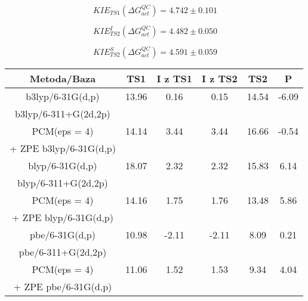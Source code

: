 \documentclass[10pt,a4paper]{article}
\begin{document}
    \begin{equation}
    KIE_{TS1} \left( \Delta  G^{QC}_{act} \right) = 4.742 \pm 0.101
  \end{equation}
  
   \begin{equation}
    KIE^I_{TS2} \left( \Delta  G^{QC}_{act} \right) = 4.482 \pm 0.050
  \end{equation}
  
  
  
  \begin{equation}
    KIE^S_{TS2} \left( \Delta  G^{QC}_{act} \right) = 4.591 \pm 0.059
  \end{equation}
  


   \begin{tabular}{||c c c c c c||} 
 \hline
 Metoda/Baza & TS1 & I z TS1 & I z TS2 & TS2 & P \\ [0.5ex] 
 \hline\hline
b3lyp/6-31G(d,p) & 13.96 &  0.16 & 0.15 & 14.54 & -6.09 \\
\hline
b3lyp/6-311+G(2d,2p) & & & & & \\ 
PCM(eps = 4)  & 14.14  & 3.44  & 3.44 & 16.66 & -0.54 \\
+ ZPE b3lyp/6-31G(d,p) & & & & & \\ 
\hline\hline
blyp/6-31G(d,p) & 18.07 &  2.32 & 2.32 & 15.83 & 6.14 \\
\hline
blyp/6-311+G(2d,2p) & & & & & \\ 
PCM(eps = 4)  & 14.16  & 1.75  & 1.76 & 13.48 & 5.86 \\
+ ZPE blyp/6-31G(d,p)  & & & & & \\ 
\hline\hline
pbe/6-31G(d,p) & 10.98 &  -2.11 & -2.11 & 8.09 & 0.21 \\
\hline
pbe/6-311+G(2d,2p) & & & & & \\ 
PCM(eps = 4)  & 11.06  & 1.52  & 1.53 & 9.34 & 4.04 \\
+ ZPE pbe/6-31G(d,p)  & & & & & \\ 
 \hline
 
\end{tabular}

 
\end{document}
